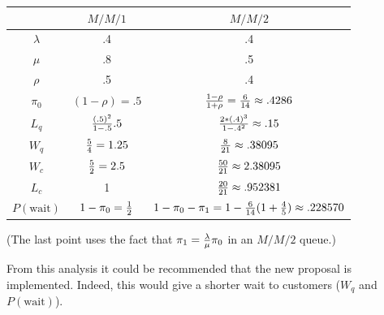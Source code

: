 \documentclass[12pt]{article}
\begin{document}
\begin{enumerate}
\begin{center}
\begin{tabular}{c|c|c}
         &$M/M/1$&$M/M/2$\\\hline
$\lambda$&.4     &.4     \\
$\mu$    &.8     &.5     \\
$\rho$   &.5     &.4     \\\hline
$\pi_0$  &$(1-\rho)=.5$     &${1-\rho\over1+\rho}={6\over14}\approx.4286$\\
$L_q$&${(.5)^2\over 1-.5}.5$&${2*(.4)^3\over 1-.4^2} \approx.15$\\
$W_q$&${5\over4}= 1.25$&${8\over 21}\approx.38095$\\
$W_c$&  ${5\over2}=2.5$&${50\over 21}\approx2.38095$\\
$L_c$&1&${20\over21}\approx.952381$\\
$P(\text{wait})$&$1-\pi_0={1\over2}$&$1-\pi_0-\pi_1=1-{6\over14}(1+{4\over5})\approx.228570$
\end{tabular}
\end{center}
(The last point uses the fact that $\pi_1={\lambda\over\mu}\pi_0$ in an $M/M/2$ queue.)

From this analysis it could be recommended that the new proposal is implemented. Indeed, this would give a shorter wait to customers ($W_q$ and $P(\text{wait})$).
\end{enumerate}
\end{document}
